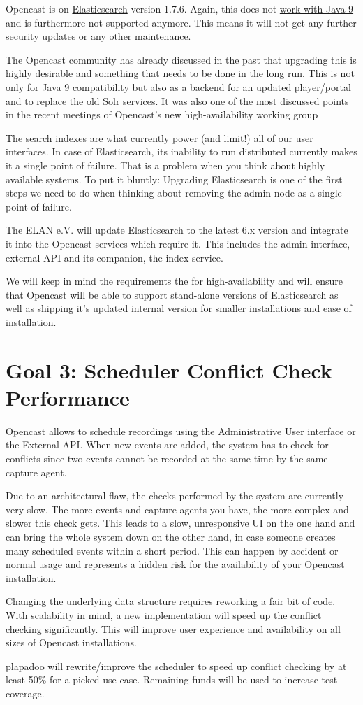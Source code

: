 \documentclass[a4paper]{article}
\begin{document}
Opencast is on
\href{https://www.elastic.co/products/elasticsearch}{Elasticsearch} version
1.7.6. Again, this does not
\href{https://www.elastic.co/support/matrix#matrix_jvm}{work with Java 9} and
is furthermore not supported anymore. This means it will not get any further
security updates or any other maintenance.

The Opencast community has already discussed in the past that upgrading
this is highly desirable and something that needs to be done in the
long run. This is not only for Java 9 compatibility but also as a
backend for an updated player/portal and to replace the old Solr
services. It was also one of the most discussed points in the recent
meetings of Opencast's new high-availability working group

The search indexes are what currently power (and limit!) all of our
user interfaces. In case of Elasticsearch, its inability to run
distributed currently makes it a single point of failure. That is a
problem when you think about highly available systems. To put it
bluntly: Upgrading Elasticsearch is one of the first steps we need to
do when thinking about removing the admin node as a single point of
failure.

The ELAN e.V. will update Elasticsearch to the latest 6.x version and
integrate it into the Opencast services which require it. This includes
the admin interface, external API and its companion, the index service.

We will keep in mind the requirements the for high-availability and
will ensure that Opencast will be able to support stand-alone versions
of Elasticsearch as well as shipping it's updated internal version for
smaller installations and ease of installation.


\section*{Goal 3: Scheduler Conflict Check Performance}

Opencast allows to schedule recordings using the Administrative User
interface or the External API. When new events are added, the system
has to check for conflicts since two events cannot be recorded at the
same time by the same capture agent.

Due to an architectural flaw, the checks performed by the system are
currently very slow. The more events and capture agents you have, the
more complex and slower this check gets. This leads to a slow,
unresponsive UI on the one hand and can bring the whole system down on
the other hand, in case someone creates many scheduled events within a
short period. This can happen by accident or normal usage and
represents a hidden risk for the availability of your Opencast
installation.

Changing the underlying data structure requires reworking a fair bit of
code. With scalability in mind, a new implementation will speed up the
conflict checking significantly. This will improve user experience and
availability on all sizes of Opencast installations.


plapadoo will rewrite/improve the scheduler to speed up conflict
checking by at least 50\% for a picked use case. Remaining funds will be
used to increase test coverage.
\end{document}
